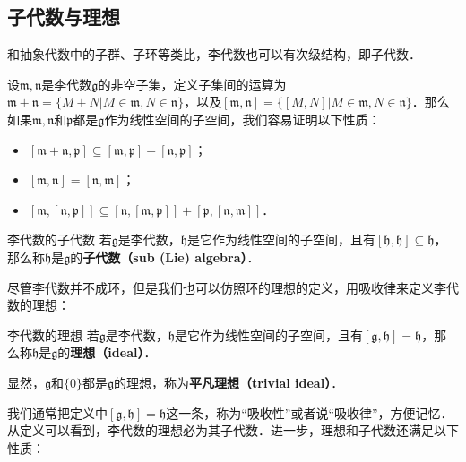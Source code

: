 




\subsection{子代数与理想}
和抽象代数中的子群、子环等类比，李代数也可以有次级结构，即子代数．

设$\mathfrak{m}, \mathfrak{n}$是李代数$\mathfrak{g}$的非空子集，定义子集间的运算为$\mathfrak{m}+\mathfrak{n}=\{M+N|M\in\mathfrak{m}, N\in\mathfrak{n}\}$，以及$[\mathfrak{m}, \mathfrak{n}]=\{[M, N]|M\in\mathfrak{m}, N\in\mathfrak{n}\}$．那么如果$\mathfrak{m}, \mathfrak{n}$和$\mathfrak{p}$都是$\mathfrak{g}$作为线性空间的子空间，我们容易证明以下性质：

\begin{itemize}
\item $[\mathfrak{m}+\mathfrak{n}, \mathfrak{p}]\subseteq[\mathfrak{m}, \mathfrak{p}]+[\mathfrak{n}, \mathfrak{p}]$；
\item $[\mathfrak{m},\mathfrak{n}]=[\mathfrak{n}, \mathfrak{m}]$；
\item $[\mathfrak{m}, [\mathfrak{n}, \mathfrak{p}]]\subseteq[\mathfrak{n}, [\mathfrak{m}, \mathfrak{p}]]+[\mathfrak{p}, [\mathfrak{n}, \mathfrak{m}]]$．
\end{itemize}

\begin{definition}{李代数的子代数}
若$\mathfrak{g}$是李代数，$\mathfrak{h}$是它作为线性空间的子空间，且有$[\mathfrak{h}, \mathfrak{h}]\subseteq\mathfrak{h}$，那么称$\mathfrak{h}$是$\mathfrak{g}$的\textbf{子代数（sub (Lie) algebra）}．
\end{definition}


尽管李代数并不成环，但是我们也可以仿照环的理想的定义，用吸收律来定义李代数的理想：

\begin{definition}{李代数的理想}
若$\mathfrak{g}$是李代数，$\mathfrak{h}$是它作为线性空间的子空间，且有$[\mathfrak{g}, \mathfrak{h}]=\mathfrak{h}$，那么称$\mathfrak{h}$是$\mathfrak{g}$的\textbf{理想（ideal）}．

显然，$\mathfrak{g}$和$\{0\}$都是$\mathfrak{g}$的理想，称为\textbf{平凡理想（trivial ideal）}．
\end{definition}

我们通常把定义中$[\mathfrak{g}, \mathfrak{h}]=\mathfrak{h}$这一条，称为“吸收性”或者说“吸收律”，方便记忆．从定义可以看到，李代数的理想必为其子代数．进一步，理想和子代数还满足以下性质：

